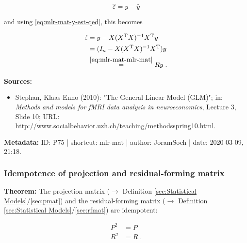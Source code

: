\documentclass[a4paper,12pt,twoside]{book}
\begin{document}
\begin{equation} \label{eq:mlr-mat-e-est}
\hat{\varepsilon} = y - \hat{y}
\end{equation}

and using \eqref{eq:mlr-mat-y-est-qed}, this becomes

\begin{equation} \label{eq:mlr-mat-e-est-qed}
\begin{split}
\hat{\varepsilon} &= y - X (X^\mathrm{T} X)^{-1} X^\mathrm{T} y \\
&= (I_n - X (X^\mathrm{T} X)^{-1} X^\mathrm{T}) y \\
&\overset{\eqref{eq:mlr-mat-mlr-mat}}{=} R y \; .
\end{split}
\end{equation}


\vspace{1em}
\textbf{Sources:}
\begin{itemize}
\item Stephan, Klaas Enno (2010): "The General Linear Model (GLM)"; in: \textit{Methods and models for fMRI data analysis in neuroeconomics}, Lecture 3, Slide 10; URL: \url{http://www.socialbehavior.uzh.ch/teaching/methodsspring10.html}.
\end{itemize}


\vspace{1em}
\textbf{Metadata:} ID: P75 | shortcut: mlr-mat | author: JoramSoch | date: 2020-03-09, 21:18.
\vspace{1em}



\subsubsection[\textbf{Idempotence of projection and residual-forming matrix}]{Idempotence of projection and residual-forming matrix} \label{sec:mlr-idem}
\setcounter{equation}{0}

\textbf{Theorem:} The projection matrix ($\rightarrow$ Definition \ref{sec:Statistical Models}/\ref{sec:pmat}) and the residual-forming matrix ($\rightarrow$ Definition \ref{sec:Statistical Models}/\ref{sec:rfmat}) are idempotent:

\begin{equation} \label{eq:mlr-idem-P^2-R^2}
\begin{split}
P^2 &= P \\
R^2 &= R \; .
\end{split}
\end{equation}
\end{document}

